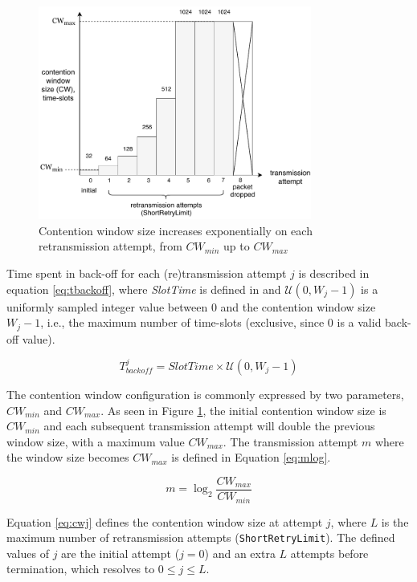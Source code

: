 \begin{figure}
\center
\includegraphics[width=0.8\textwidth]{images/contention-window-sizes.pdf}
\caption{Contention window size increases exponentially on each retransmission attempt, from $\mathit{CW}_{min}$ up to $\mathit{CW}_{max}$}
\label{fig:cwsizes}
\end{figure}

Time spent in back-off for each (re)transmission attempt $j$ is described in
equation \ref{eq:tbackoff}, where \emph{SlotTime} is defined in \cite{654749}
and $\mathcal{U}(0,W_j-1)$ is a uniformly sampled integer value between $0$
and the contention window size $W_{j}-1$, i.e., the maximum number of
time-slots (exclusive, since 0 is a valid back-off value).

\begin{equation} \label{eq:tbackoff}
T^j_{\mathit{backoff}} = \mathit{SlotTime} \times \mathcal{U}(0,W_j-1)
\end{equation}

The contention window configuration is commonly expressed by two parameters,
$CW_{min}$ and $CW_{max}$. As seen in Figure \ref{fig:cwsizes}, the initial
contention window size is $CW_{min}$ and each subsequent transmission attempt
will double the previous window size, with a maximum value $CW_{max}$. The
transmission attempt $m$ where the window size becomes $\mathit{CW}_{max}$ is
defined in Equation \ref{eq:mlog}.

\begin{equation} \label{eq:mlog}
m = \log_2 \frac{\mathit{CW}_{max}}{\mathit{CW}_{min}}
\end{equation}

Equation \ref{eq:cwj} defines the contention window size at attempt $j$, where
$L$ is the maximum number of retransmission attempts
(\texttt{ShortRetryLimit}). The defined values of $j$ are the initial attempt
($j=0$) and an extra $L$ attempts before termination, which resolves to $0
\leq j \leq L$.

